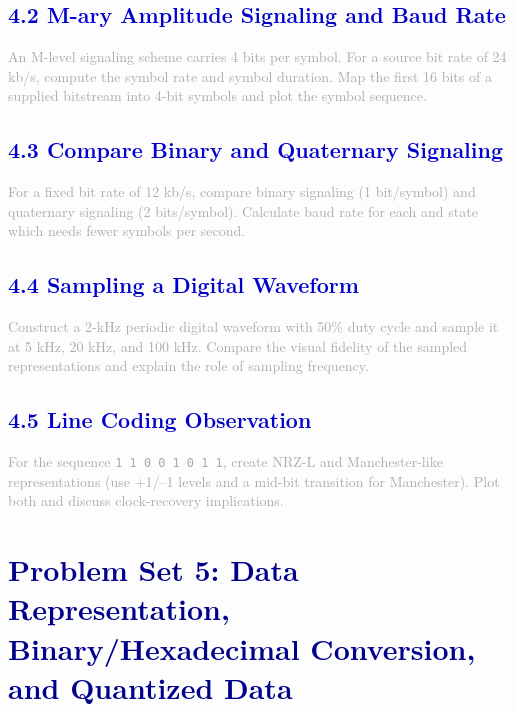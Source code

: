 \documentclass[12pt,a4paper]{article}
\begin{document}
\subsection*{\large\textbf{\textcolor{mediumblue}{4.2 M-ary Amplitude Signaling and Baud Rate}}}

\textcolor{darkgray}{
An M-level signaling scheme carries 4 bits per symbol. For a source bit rate of 24 kb/s, compute the symbol rate and symbol duration. Map the first 16 bits of a supplied bitstream into 4-bit symbols and plot the symbol sequence.
}

\subsection*{\large\textbf{\textcolor{mediumblue}{4.3 Compare Binary and Quaternary Signaling}}}

\textcolor{darkgray}{
For a fixed bit rate of 12 kb/s, compare binary signaling (1 bit/symbol) and quaternary signaling (2 bits/symbol). Calculate baud rate for each and state which needs fewer symbols per second.
}

\subsection*{\large\textbf{\textcolor{mediumblue}{4.4 Sampling a Digital Waveform}}}

\textcolor{darkgray}{
Construct a 2-kHz periodic digital waveform with 50\% duty cycle and sample it at 5 kHz, 20 kHz, and 100 kHz. Compare the visual fidelity of the sampled representations and explain the role of sampling frequency.
}

\subsection*{\large\textbf{\textcolor{mediumblue}{4.5 Line Coding Observation}}}

\textcolor{darkgray}{
For the sequence \texttt{1 1 0 0 1 0 1 1}, create NRZ-L and Manchester-like representations (use +1/--1 levels and a mid-bit transition for Manchester). Plot both and discuss clock-recovery implications.
}

\newpage

\section*{\LARGE\textbf{\textcolor{darkblue}{Problem Set 5: Data Representation, Binary/Hexadecimal Conversion, and Quantized Data}}}
\end{document}
